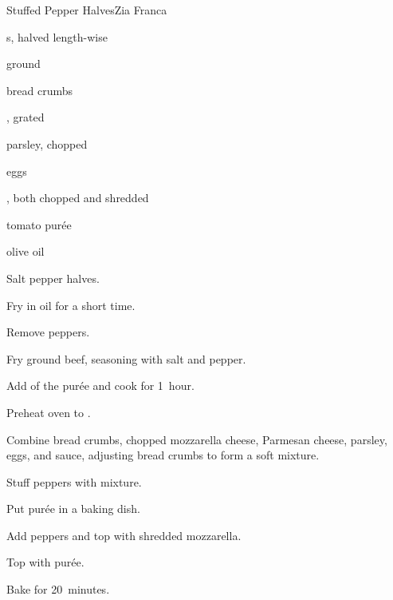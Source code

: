 \begin{recipe}{Stuffed Pepper Halves}{Zia Franca}{}

\begin{ingredients}
\item {}s, halved length-wise
\item ground 
\item bread crumbs
\item {}, grated
\item parsley, chopped
\item eggs
\item {}, both chopped and shredded
\item tomato pur\'ee
\item olive oil
\end{ingredients}

\begin{directions}
\item Salt pepper halves.
\item Fry in oil for a short time.
\item Remove peppers.
\item Fry ground beef, seasoning with salt and pepper.
\item Add \half{} of the pur\'ee and cook for 1~hour.
\item Preheat oven to .
\item Combine bread crumbs, chopped mozzarella cheese, Parmesan cheese, parsley, eggs, and sauce, adjusting bread crumbs to form a soft mixture.
\item Stuff peppers with mixture.
\item Put pur\'ee in a baking dish.
\item Add peppers and top with shredded mozzarella.
\item Top with pur\'ee.
\item Bake for 20~minutes.
\end{directions}

\end{recipe}
